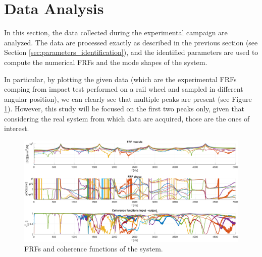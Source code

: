 \section{Data Analysis}
\label{sec:data_analysis}

In this section, the data collected during the experimental campaign are analyzed.
The data are processed exactly as described in the previous section (see Section \ref{sec:parameters_identification}), and the identified parameters are used to compute the numerical FRFs and the mode shapes of the system.

In particular, by plotting the given data (which are the experimental FRFs comping from impact test performed on a rail wheel and sampled in different angular position), we can clearly see that multiple peaks are present (see Figure \ref{fig:FRFs_part_B}).
However, this study will be focused on the first two peaks only, given that considering the real system from which data are acquired, those are the ones of interest.

\begin{figure}[H]
    \centering
    \includegraphics[width=\textwidth]{img/MATLAB/Part_B/Experimental_data.png}
    \caption{FRFs and coherence functions of the system.}
    \label{fig:FRFs_part_B}
\end{figure}





